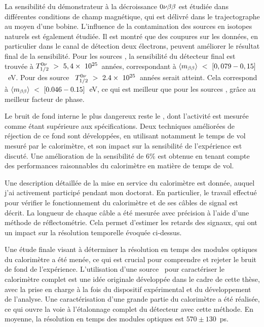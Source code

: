 \begin{mdframed}[linecolor=Prune,linewidth=1]
\begin{footnotesize}
\begin{multicols}{2}
La sensibilité du démonstrateur à la décroissance $0\nu\beta\beta$ est étudiée dans différentes conditions de champ magnétique, qui est délivré dans le trajectographe au moyen d'une bobine.
L'influence de la contamination des sources en isotopes naturels est également étudiée.
Il est montré que des coupures sur les données, en particulier dans le canal de détection deux électrons, peuvent améliorer le résultat final de la sensibilité.
Pour les sources \Se, la sensibilité du détecteur final est trouvée à $T_{1/2}^{0\nu}~>~5,4\times~10^{25}$~années, correspondant à $\langle m_{\beta\beta}\rangle~<~[0,079-0,15]$~eV.
Pour des source \Nd\ $T_{1/2}^{0\nu}~>~2.4\times~10^{25}$~années serait atteint.
Cela correspond à $\langle m_{\beta\beta}\rangle~<~[0.046-0.15]$~eV, ce qui est meilleur que pour les sources \Se, grâce au meilleur facteur de phase.

Le bruit de fond interne le plus dangereux reste le \Tl, dont l'activité est mesurée comme étant supérieure aux spécifications.
Deux techniques améliorées de réjection de ce fond sont développées, en utilisant notamment le temps de vol mesuré par le calorimètre, et son impact sur la sensibilité de l'expérience est discuté.
Une amélioration de la sensibilité de $6$\% est obtenue en tenant compte des performances raisonnables du calorimètre en matière de temps de vol.

Une description détaillée de la mise en service du calorimètre est donnée, auquel j'ai activement participé pendant mon doctorat.
En particulier, le travail effectué pour vérifier le fonctionnement du calorimètre et de ses câbles de signal est décrit.
La longueur de chaque câble a été mesurée avec précision à l'aide d'une méthode de réflectométrie.
Cela permet d'estimer les retards des signaux, qui ont un impact sur la résolution temporelle évoquée ci-dessus.

Une étude finale visant à déterminer la résolution en temps des modules optiques du calorimètre a été menée, ce qui est crucial pour comprendre et rejeter le bruit de fond de l'expérience.
L'utilisation d'une source \Co\ pour caractériser le calorimètre complet est une idée originale développée dans le cadre de cette thèse, avec la prise en charge à la fois du dispositif expérimental et du développement de l'analyse.
Une caractérisation d'une grande partie du calorimètre a été réalisée, ce qui ouvre la voie à l'étalonnage complet du détecteur avec cette méthode.
En moyenne, la résolution en temps des modules optiques est $570\pm 130$~ps.

\end{multicols}
\end{footnotesize}
\end{mdframed}
\noindent

